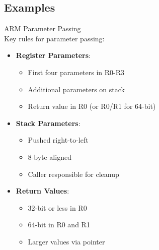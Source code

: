 \subsection{Examples}

\begin{concept}{ARM Parameter Passing}\\
Key rules for parameter passing:
\begin{itemize}
  \item \textbf{Register Parameters}:
    \begin{itemize}
      \item First four parameters in R0-R3
      \item Additional parameters on stack
      \item Return value in R0 (or R0/R1 for 64-bit)
    \end{itemize}
  \item \textbf{Stack Parameters}:
    \begin{itemize}
      \item Pushed right-to-left
      \item 8-byte aligned
      \item Caller responsible for cleanup
    \end{itemize}
  \item \textbf{Return Values}:
    \begin{itemize}
      \item 32-bit or less in R0
      \item 64-bit in R0 and R1
      \item Larger values via pointer
    \end{itemize}
\end{itemize}
\end{concept}


